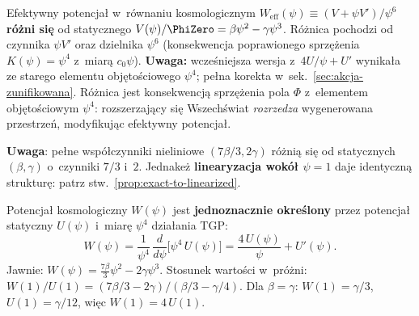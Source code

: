 \begin{remark}\label{rem:cosmo-vs-static}
Efektywny potencja\l{} w~r\'ownaniu kosmologicznym
$W_{\mathrm{eff}}(\psi) \equiv (V + \psi V')/\psi^6$
\textbf{r\'o\.zni si\k{e}} od statycznego
$V(\psi)/\PhiZero = \beta\psi^2 - \gamma\psi^3$.
R\'o\.znica pochodzi od czynnika $\psi V'$ oraz dzielnika $\psi^6$
(konsekwencja poprawionego sprz\k{e}\.zenia $K(\psi)=\psi^4$
z~miar\k{a} $c_0\psi$).
\textbf{Uwaga:} wcze\'sniejsza wersja z~$4U/\psi + U'$
wynika\l{}a ze starego elementu obj\k{e}to\'sciowego $\psi^4$;
pe\l{}na korekta w~sek.~\ref{sec:akcja-zunifikowana}.
R\'o\.znica jest konsekwencj\k{a} sprz\k{e}\.zenia pola $\Phi$
z~elementem obj\k{e}to\'sciowym $\psi^4$: rozszerzaj\k{a}cy si\k{e}
Wszech\'swiat \emph{rozrzedza} wygenerowana przestrze\'n, modyfikuj\k{a}c
efektywny potencja\l{}.

\textbf{Uwaga}: pe\l{}ne wsp\'o\l{}czynniki nieliniowe
$(7\beta/3, 2\gamma)$ r\'o\.zni\k{a} si\k{e} od statycznych
$(\beta, \gamma)$ o~czynniki $7/3$ i~$2$.
Jednake\.z \textbf{linearyzacja wok\'o\l{} $\psi = 1$}
daje identyczn\k{a} struktur\k{e}: patrz
stw.~\ref{prop:exact-to-linearized}.
\end{remark}

\begin{proposition}%
\label{prop:W-from-U}
Potencja\l{} kosmologiczny $W(\psi)$ jest \textbf{jednoznacznie okre\'slony}
przez potencja\l{} statyczny $U(\psi)$ i~miar\k{e} $\psi^4$ dzia\l{}ania TGP:
\begin{equation}\label{eq:W-from-U}
  \boxed{
    W(\psi) = \frac{1}{\psi^4}\,\frac{d}{d\psi}\bigl[\psi^4\,U(\psi)\bigr]
    = \frac{4\,U(\psi)}{\psi} + U'(\psi).
  }
\end{equation}
Jawnie: $W(\psi) = \frac{7\beta}{3}\psi^2 - 2\gamma\psi^3$.
Stosunek warto\'sci w~pr\'o\.zni: $W(1)/U(1) = (7\beta/3 - 2\gamma)/(\beta/3 - \gamma/4)$.
Dla $\beta = \gamma$: $W(1) = \gamma/3$, $U(1) = \gamma/12$, wi\k{e}c $W(1) = 4\,U(1)$.
\end{proposition}

